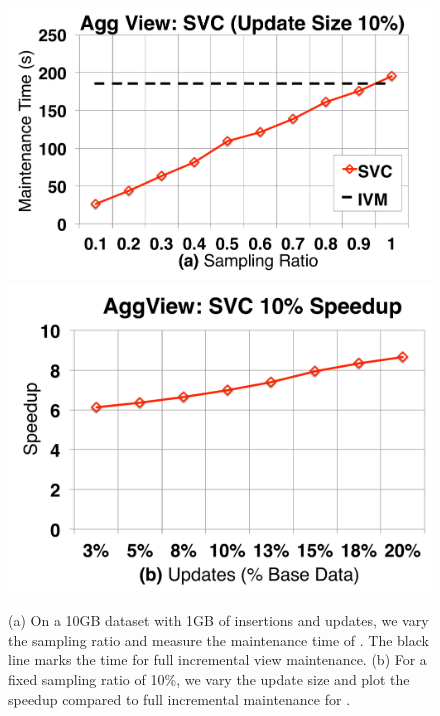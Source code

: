 \begin{figure}[t]
\centering
 \includegraphics[scale=0.13]{exp/msdc_1.pdf}
 \includegraphics[scale=0.13]{exp/msdc_2.pdf}\vspace{-.5em}
   \caption{(a) On a 10GB dataset with 1GB of insertions and updates, we vary the sampling ratio and measure the maintenance time of \svc. The black line marks the time for full incremental view maintenance. (b) For a fixed sampling ratio of 10\%, we vary the update size and plot the speedup compared to full incremental maintenance for \svc.\label{exp2-acc-sample}}
\end{figure}


